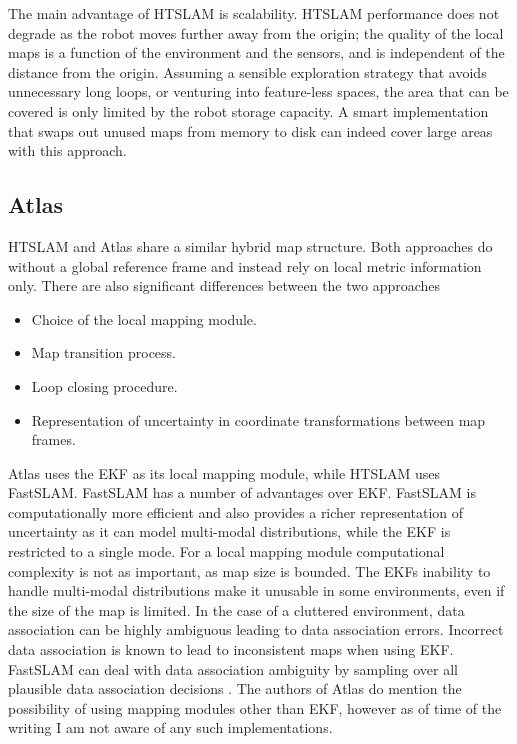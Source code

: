 The main advantage of HTSLAM is scalability. HTSLAM performance does
not degrade as the robot moves further away from the origin; the
quality of the local maps is a function of the environment and the
sensors, and is independent of the distance from the origin. Assuming
a sensible exploration strategy that avoids unnecessary long loops, or
venturing into feature-less spaces, the area that can be covered is
only limited by the robot storage capacity. A smart implementation
that swaps out unused maps from memory to disk can indeed cover large
areas with this approach.

\subsection{Atlas}

HTSLAM and Atlas share a similar hybrid map structure. Both approaches
do without a global reference frame and instead rely on local metric
information only. There are also significant differences between the
two approaches

\begin{itemize}
\item Choice of the local mapping module.
\item Map transition process.
\item Loop closing procedure.
\item Representation of uncertainty in coordinate transformations
  between map frames.
\end{itemize}

Atlas uses the EKF as its local mapping module, while HTSLAM uses
FastSLAM. FastSLAM has a number of advantages over EKF. FastSLAM is
computationally more efficient and also provides a richer
representation of uncertainty as it can model multi-modal
distributions, while the EKF is restricted to a single mode. For a local
mapping module computational complexity is not as important, as map
size is bounded. The EKFs inability to handle multi-modal distributions
make it unusable in some environments, even if the size of the map is
limited. In the case of a cluttered environment, data association can be
highly ambiguous leading to data association errors. Incorrect data
association is known to lead to inconsistent maps when using EKF.
FastSLAM can deal with data association ambiguity by sampling over all
plausible data association decisions
\cite{fastslam,Montemerlo02d,nieto2003}. The authors of Atlas do mention
the possibility of using mapping modules other than EKF, however as of
time of the writing I am not aware of any such implementations.


